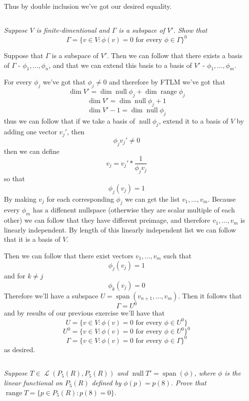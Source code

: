\documentclass[11pt,oneside,titlepage]{book}
\DeclareMathOperator \map {\mathcal {L}}
\DeclareMathOperator \ns {null}
\DeclareMathOperator \range {range}
\DeclareMathOperator \Span {span}
\begin{document}
Thus by double inclusion we've got our desired equality.

\subsection{}

\textit{Suppose $V$ is finite-dimentional and $\Gamma$ is a subspace of $V'$. Show that }
$$\Gamma = \{v \in V: \phi(v) = 0 \text{ for every } \phi \in \Gamma \}^0$$

Suppose that $\Gamma$ is a subspace of $V'$. Then we can follow that there exists a
basis of $\Gamma$ -  $\phi_1, ..., \phi_n$, and that we can extend this basis to a basis of
$V'$ - $\phi_1, ..., \phi_m$.

For every $\phi_j$ we've got that $\phi_j \neq 0$ and therefore by FTLM we've got that
$$\dim V' = \dim \ns \phi_j + \dim \range \phi_j$$
$$\dim V' = \dim \ns \phi_j + 1$$
$$\dim V' - 1 = \dim \ns \phi_j$$
thus we can follow that if we take a basis of $\ns \phi_j$, extend it to a basis of $V$ by adding
one vector $v_j'$, then
$$\phi_j v_j' \neq 0$$
then we can define
$$v_j = v_j' * \frac{1}{\phi_j v_j}$$
so that
$$\phi_j(v_j) = 1$$
By making $v_j$ for each corresponding $\phi_j$ we can get the list $v_1, ..., v_m$.
Because every $\phi_m$ has a diffenent nullspace (otherwise they are scalar multiple
of each other) we can follow that they have different preimage, and therefore
$v_1, ..., v_m$ is linearly independent. By length of this linearly independent list we
can follow that it is a basis of $V$.

Then we can follow that there exist vectors
$v_1, ..., v_m$ such that
$$\phi_j(v_j) = 1$$
and for $k \neq j$
$$\phi_k(v_j) = 0$$
Therefore we'll have a subspace $U = \Span(v_{n + 1}, ..., v_m)$. Then it follows that
$$\Gamma = U^0$$
and by results of our previous exercise we'll have that
$$U =  \{v \in V: \phi(v) = 0 \text{ for every } \phi \in U^0 \}$$
$$U^0 =  \{v \in V: \phi(v) = 0 \text{ for every } \phi \in U^0 \}^0$$
$$\Gamma =  \{v \in V: \phi(v) = 0 \text{ for every } \phi \in \Gamma \}^0$$
as desired.

\subsection{}

\textit{Suppose $T \in \map(P_5(R), P_5(R))$ and $\ns T' = \Span(\phi)$, where $\phi$ is
  the linear functional on $P_5(R)$ defined by $\phi(p) = p(8)$. Prove that
  $\range T = \{p \in P_5(R): p(8) = 0\}$.}
\end{document}
